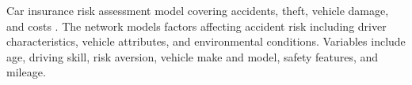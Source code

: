 Car insurance risk assessment model covering accidents, theft, vehicle damage, and costs \cite{binder1997}. The network models factors affecting accident risk including driver characteristics, vehicle attributes, and environmental conditions. Variables include age, driving skill, risk aversion, vehicle make and model, safety features, and mileage.
